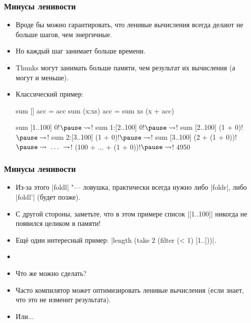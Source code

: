 \documentclass[11pt]{beamer}
\begin{document}
\begin{frame}[fragile]
  \frametitle{Минусы ленивости}
  \begin{itemize}
    \item Вроде бы можно гарантировать, что ленивые вычисления всегда делают не больше шагов, чем энергичные.
    \item Но каждый шаг занимает больше времени.
    \item Thunks могут занимать больше памяти, чем результат их вычисления (а могут и меньше).
    \item Классический пример:
          \begin{haskell}
            sum [] acc = acc
            sum (x:xs) acc = sum xs (x + acc)

            sum [1..100] 0!$\pause \rightsquigarrow$! sum 1:[2..100] 0!$\pause \rightsquigarrow$!
            sum [2..100] (1 + 0)!$\pause \rightsquigarrow$! sum 2:[3..100] (1 + 0)!$\pause \rightsquigarrow$!
            sum [3..100] (2 + (1 + 0))!$\pause \rightsquigarrow \ \ldots\ \rightsquigarrow$!
            (100 + ... + (1 + 0))!$\pause \rightsquigarrow $! 4950
          \end{haskell}
  \end{itemize}
\end{frame}

\begin{frame}[fragile]
  \frametitle{Минусы ленивости}
  \begin{itemize}
    \item Из-за этого \haskinline|foldl| "--- ловушка, практически всегда нужно либо \haskinline|foldr|, либо \haskinline|foldl'| (будет позже).
          \pause
    \item С другой стороны, заметьте, что в этом примере список \haskinline|[1..100]| никогда не появился целиком в памяти!
          \pause
    \item Ещё один интересный пример: \haskinline|length (take 2 (filter (< 1) [1..]))|.
    \item[]
      \pause
    \item Что же можно сделать?
          \pause
    \item Часто компилятор может оптимизировать ленивые вычисления (если знает, что это не изменит результата).
    \item Или...
  \end{itemize}
\end{frame}
\end{document}
